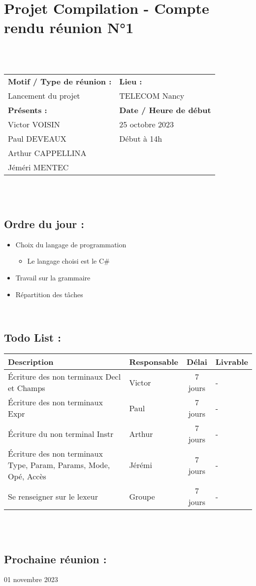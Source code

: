 \documentclass{article}
\begin{document}
\section*{Projet Compilation - Compte rendu réunion N°1}
~\\\\
\begin{tabular}{|p{7cm}|p{6cm}|}
    \hline
    \textbf{Motif / Type de réunion :}
    & \textbf{Lieu :}
    \\
    Lancement du projet
    &
    TELECOM Nancy
    \\ \hline
    \textbf{Présents :}
    &
    \textbf{Date / Heure de début}
    \\
    Victor VOISIN &  25 octobre 2023\\
    Paul DEVEAUX & Début à 14h\\
    Arthur CAPPELLINA & \\
    Jéméri MENTEC &
    \\ \hline
\end{tabular}
\\\\

\subsection*{Ordre du jour :}
\begin{itemize}
    \item{Choix du langage de programmation} 
        \begin{itemize}
            \item{Le langage choisi est le C\#}
        \end{itemize}
    \item{Travail sur la grammaire}
    \item{Répartition des tâches}
\end{itemize}
~

\subsection*{Todo List :}
\renewcommand{\arraystretch}{1.5}
\begin{tabular}{|p{5cm}|l|c|p{4.5cm}|}
    \hline
    Description & Responsable & Délai & Livrable
    \\ \hline
    Écriture des non terminaux Decl et Champs & Victor  & 7 jours & - \\
    Écriture des non terminaux Expr & Paul  & 7 jours & - \\
    Écriture du non terminal Instr & Arthur  & 7 jours & - \\
    Écriture des non terminaux Type, Param, Params, Mode, Opé, Accès & Jérémi  & 7 jours & -\\
    Se renseigner sur le lexeur & Groupe & 7 jours & -
    \\ \hline
\end{tabular}
\\\\

\subsection*{Prochaine réunion :} 01 novembre 2023
\end{document}
